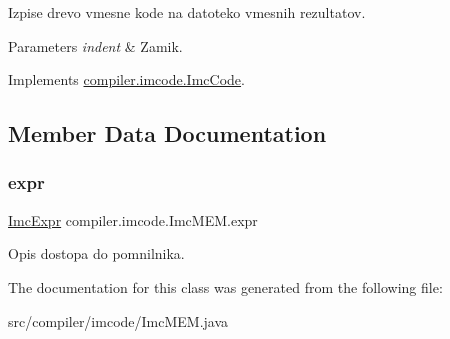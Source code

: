 Izpise drevo vmesne kode na datoteko vmesnih rezultatov.


\begin{DoxyParams}{Parameters}
{\em indent} & Zamik. \\
\hline
\end{DoxyParams}


Implements \hyperlink{interfacecompiler_1_1imcode_1_1_imc_code_a26451dea2ab4dbd7054ac33f4c6d71fe}{compiler.\+imcode.\+Imc\+Code}.



\subsection{Member Data Documentation}
\mbox{\label{classcompiler_1_1imcode_1_1_imc_m_e_m_a1640644e34627b46dbb785287d6b3869}} 
\subsubsection{\texorpdfstring{expr}{expr}}
{\footnotesize\ttfamily \hyperlink{classcompiler_1_1imcode_1_1_imc_expr}{Imc\+Expr} compiler.\+imcode.\+Imc\+M\+E\+M.\+expr}

Opis dostopa do pomnilnika. 

The documentation for this class was generated from the following file\+:\begin{DoxyCompactItemize}
\item 
src/compiler/imcode/Imc\+M\+E\+M.\+java\end{DoxyCompactItemize}
